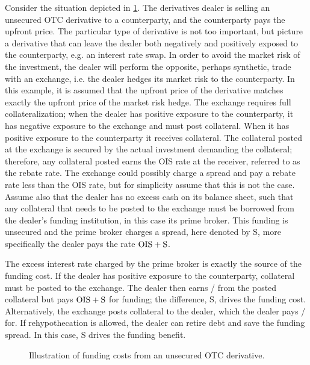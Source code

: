 \documentclass[main.tex]{subfiles}
\begin{document}
        Consider the situation depicted in \cref{fig:funding-costs-unsecured-derivative}.
        The derivatives dealer is selling an unsecured OTC derivative to a counterparty,
        and the counterparty pays the upfront price.
        The particular type of derivative is not too important, 
        but picture a derivative that can leave the dealer both negatively and positively exposed to the counterparty, 
        e.g. an interest rate swap.
        In order to avoid the market risk of the investment, 
        the dealer will perform the opposite, perhaps synthetic, trade with an exchange,
        i.e. the dealer hedges its market risk to the counterparty.
        In this example, it is assumed that the upfront price of the derivative 
        matches exactly the upfront price of the market risk hedge.
        The exchange requires full collateralization;
        when the dealer has positive exposure to the counterparty, 
        it has negative exposure to the exchange and must post collateral. 
        When it has positive exposure to the counterparty it receives collateral.
        The collateral posted at the exchange is secured by the actual investment demanding the collateral;
        therefore, any collateral posted earns the OIS rate at the receiver, referred to as the rebate rate.
        The exchange could possibly charge a spread and pay a rebate rate less than the OIS rate,
        but for simplicity assume that this is not the case.
        Assume also that the dealer has no excess cash on its balance sheet, 
        such that any collateral that needs to be posted to the exchange 
        must be borrowed from the dealer's funding institution,
        in this case its prime broker. 
        This funding is unsecured and the prime broker charges a spread, here denoted by S,
        more specifically the dealer pays the rate $\OIS/ + \text{S}$.

        The excess interest rate charged by the prime broker is exactly the source of the funding cost.
        If the dealer has positive exposure to the counterparty, collateral must be posted to the exchange.
        The dealer then earns \OIS/ from the posted collateral but pays $\OIS/ + \text{S}$ for funding;
        the difference, S, drives the funding cost.
        Alternatively, the exchange posts collateral to the dealer, which the dealer pays \OIS/ for.
        If rehypothecation is allowed, the dealer can retire debt and save the funding spread.
        In this case, S drives the funding benefit.

        \begin{figure}
            \centering
            \resizebox{\textwidth}{!}{%
            \begin{tikzpicture}
                
            \end{tikzpicture}        
            }   
            \caption{Illustration of funding costs from an unsecured OTC derivative.}
            \label{fig:funding-costs-unsecured-derivative}
        \end{figure}
\end{document}
